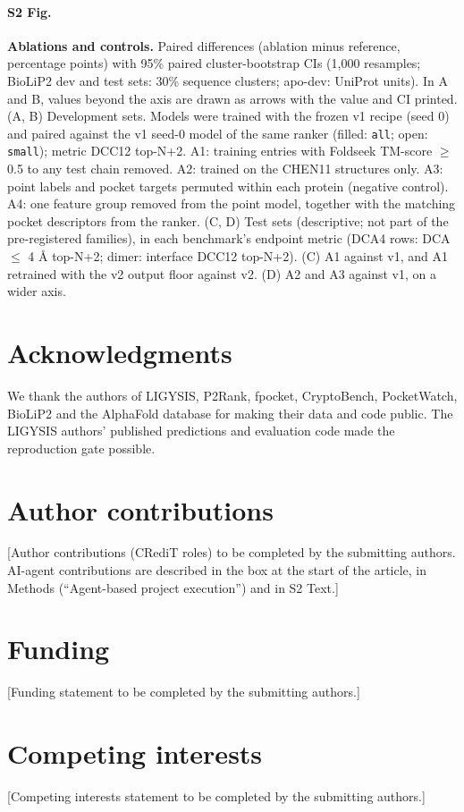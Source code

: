 \documentclass[10pt,letterpaper]{article}
\begin{document}
\paragraph*{S2 Fig.}
\label{S2_Fig}
{\bf Ablations and controls.} Paired differences (ablation minus reference, percentage points) with 95\% paired cluster-bootstrap CIs (1,000 resamples; BioLiP2 dev and test sets: 30\% sequence clusters; apo-dev: UniProt units). In A and B, values beyond the axis are drawn as arrows with the value and CI printed. (A, B) Development sets. Models were trained with the frozen v1 recipe (seed 0) and paired against the v1 seed-0 model of the same ranker (filled: \texttt{all}; open: \texttt{small}); metric DCC12 top-N+2. A1: training entries with Foldseek TM-score $\ge$ 0.5 to any test chain removed. A2: trained on the CHEN11 structures only. A3: point labels and pocket targets permuted within each protein (negative control). A4: one feature group removed from the point model, together with the matching pocket descriptors from the ranker. (C, D) Test sets (descriptive; not part of the pre-registered families), in each benchmark's endpoint metric (DCA4 rows: DCA $\le$ 4 \AA{} top-N+2; dimer: interface DCC12 top-N+2). (C) A1 against v1, and A1 retrained with the v2 output floor against v2. (D) A2 and A3 against v1, on a wider axis.

\section*{Acknowledgments}

We thank the authors of LIGYSIS, P2Rank, fpocket, CryptoBench, PocketWatch, BioLiP2 and the AlphaFold database for making their data and code public. The LIGYSIS authors' published predictions and evaluation code made the reproduction gate possible.

\section*{Author contributions}

[Author contributions (CRediT roles) to be completed by the submitting authors. AI-agent contributions are described in the box at the start of the article, in Methods (``Agent-based project execution'') and in S2 Text.]

\section*{Funding}

[Funding statement to be completed by the submitting authors.]

\section*{Competing interests}

[Competing interests statement to be completed by the submitting authors.]

\nolinenumbers

\end{document}
